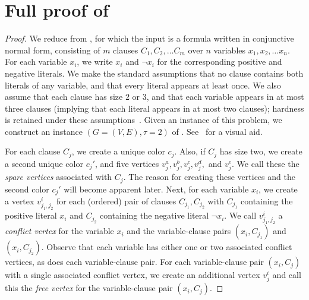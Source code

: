 \section{Full proof of~\texorpdfstring{}{}}
\label{appendix:color-fair}
\label{app:cf}
\cfmineccNPhard*

\begin{proof}
    We reduce from \boolSAT{}, for which the input is a formula written in conjunctive normal form, consisting of $m$ clauses $C_1, C_2, \ldots C_m$ over $n$ variables $x_1, x_2, \ldots x_n$.
    For each variable $x_i$, we write $x_i$ and $\neg x_i$ for the corresponding positive and negative literals.
    We make the standard assumptions that no clause contains both literals of any variable, and that every literal appears at least once.
    We also assume that each clause has size $2$ or $3$, and that each variable appears in at most three clauses (implying that each literal appears in at most two clauses); hardness is retained under these assumptions~\cite{tovey1984simplified}.
    Given an instance of this problem, we construct an instance $(G = (V, E), \tau = 2)$ of \cfminECC{}. See~ for a visual aid.

    For each clause $C_j$, we create a unique color $c_j$. Also, if $C_j$ has size two, we create a second unique color $c_j'$, and five vertices $v_j^a, v_j^b, v_j^c, v_j^d,$ and $v_j^e$.
    We call these the \emph{spare vertices} associated with $C_j$.
    The reason for creating these vertices and the second color $c_j'$ will become apparent later.
    Next, for each variable $x_i$, we create a vertex $v_{j_1, j_2}^i$ for each (ordered) pair of clauses $C_{j_1}, C_{j_2}$ with $C_{j_1}$ containing the positive literal $x_i$ and $C_{j_2}$ containing the negative literal $\neg x_i$.
    We call $v_{j_1, j_2}^i$ a \emph{conflict vertex} for the variable $x_i$ and the variable-clause pairs $(x_i, C_{j_1})$ and $(x_i, C_{j_2})$. Observe that each variable has either one or two associated conflict vertices, as does each variable-clause pair.
    For each variable-clause pair $(x_i, C_j)$ with a single associated conflict vertex, we create an additional vertex $v_j^i$ and call this the \emph{free vertex} for the variable-clause pair $(x_i, C_j)$.


\end{proof}
